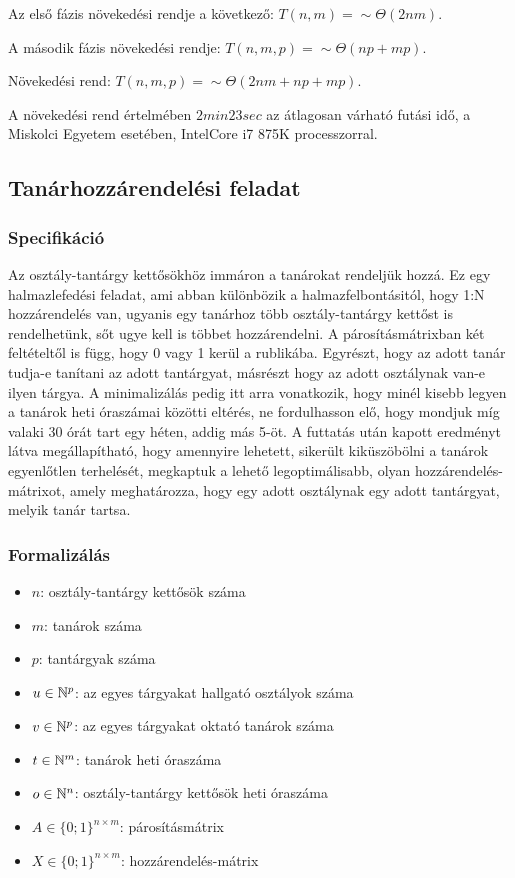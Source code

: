 \documentclass[a4paper,12pt]{article}
\begin{document}
Az első fázis növekedési rendje a következő: $T(n,m)=\sim \Theta (2nm).$

A második fázis növekedési rendje: $T(n,m,p)=\sim \Theta (np+mp).$

Növekedési rend: $T(n,m,p)=\sim \Theta (2nm+np+mp).$

A növekedési rend értelmében $2min 23sec$ az átlagosan várható futási idő, a Miskolci Egyetem esetében, IntelCore i7 875K processzorral. 

\subsection{Tanárhozzárendelési feladat}

\subsubsection{Specifikáció}

Az osztály-tantárgy kettősökhöz immáron a tanárokat rendeljük hozzá. Ez egy halmazlefedési feladat, ami abban különbözik a halmazfelbontásitól, hogy 1:N hozzárendelés van, ugyanis egy tanárhoz több osztály-tantárgy kettőst is rendelhetünk, sőt ugye kell is többet hozzárendelni. A párosításmátrixban két feltételtől is függ, hogy 0 vagy 1 kerül a rublikába. Egyrészt, hogy az adott tanár tudja-e tanítani az adott tantárgyat, másrészt hogy az adott osztálynak van-e ilyen tárgya.
A minimalizálás pedig itt arra vonatkozik, hogy minél kisebb legyen a tanárok heti óraszámai közötti eltérés, ne fordulhasson elő, hogy mondjuk míg valaki 30 órát tart egy héten, addig más 5-öt.
A futtatás után kapott eredményt látva megállapítható, hogy amennyire lehetett, sikerült kiküszöbölni a tanárok egyenlőtlen terhelését, megkaptuk a lehető legoptimálisabb, olyan hozzárendelés-mátrixot, amely meghatározza, hogy egy adott osztálynak egy adott tantárgyat, melyik tanár tartsa.

\subsubsection{Formalizálás}

\begin{itemize}
    \item $n$: osztály-tantárgy kettősök száma
    \item $m$: tanárok száma
    \item $p$: tantárgyak száma
    \item $u \in \Bbb{N}^p$: az egyes tárgyakat hallgató osztályok száma
    \item $v \in \Bbb{N}^p$: az egyes tárgyakat oktató tanárok száma
    \item $t \in \Bbb{N}^m$: tanárok heti óraszáma
    \item $o \in \Bbb{N}^n$: osztály-tantárgy kettősök heti óraszáma
    \item $A \in \{0;1\}^{n \times m}$: párosításmátrix
    \item $X \in \{0;1\}^{n \times m}$: hozzárendelés-mátrix
\end{itemize}
\end{document}
